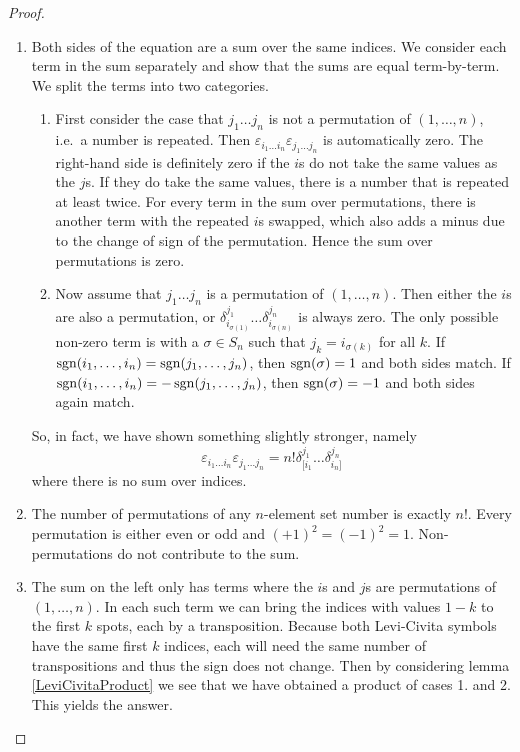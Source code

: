 \begin{proof}
\begin{enumerate}
\item Both sides of the equation are a sum over the same indices. We consider each term in the sum separately and show that the sums are equal term-by-term. We split the terms into two categories.
\begin{enumerate}
\item First consider the case that $j_1\ldots j_n$ is not a permutation of $(1,\ldots, n)$, i.e.\ a number is repeated. Then $\varepsilon_{i_1\ldots i_n}\varepsilon_{j_1\ldots j_n}$ is automatically zero. The right-hand side is definitely zero if the $i$s do not take the same values as the $j$s. If they do take the same values, there is a number that is repeated at least twice. For every term in the sum over permutations, there is another term with the repeated $i$s swapped, which also adds a minus due to the change of sign of the permutation. Hence the sum over permutations is zero.
\item Now assume that $j_1\ldots j_n$ is a permutation of $(1,\ldots, n)$. Then either the $i$s are also a permutation, or $\delta^{j_1}_{i_{\sigma(1)}} \dots \delta^{j_n}_{i_{\sigma(n)}}$ is always zero. The only possible non-zero term is with a $\sigma\in S_n$ such that $j_k = i_{\sigma(k)}$ for all $k$. If $\operatorname{sgn}(i_1,\ldots, i_n) = \operatorname{sgn}(j_1,\ldots, j_n)$, then $\operatorname{sgn}(\sigma)=1$ and both sides match. If $\operatorname{sgn}(i_1,\ldots, i_n) = -\operatorname{sgn}(j_1,\ldots, j_n)$, then $\operatorname{sgn}(\sigma)=-1$ and both sides again match. 
\end{enumerate}
So, in fact, we have shown something slightly stronger, namely 
\[ \varepsilon_{i_1\ldots i_n}\varepsilon_{j_1\ldots j_n} = n!\delta^{j_1}_{[i_1}\ldots \delta^{j_n}_{i_n]} \]
where there is no sum over indices.
\item The number of permutations of any $n$-element set number is exactly $n!$. Every permutation is either even or odd and $(+1)^2 = (-1)^2 = 1$. Non-permutations do not contribute to the sum.
\item The sum on the left only has terms where the $i$s and $j$s are permutations of $(1,\ldots, n)$. In each such term we can bring the indices with values $1-k$ to the first $k$ spots, each by a transposition. Because both Levi-Civita symbols have the same first $k$ indices, each will need the same number of transpositions and thus the sign does not change. Then by considering lemma \ref{LeviCivitaProduct} we see that we have obtained a product of cases 1. and 2. This yields the answer.

\end{enumerate}
\end{proof}
